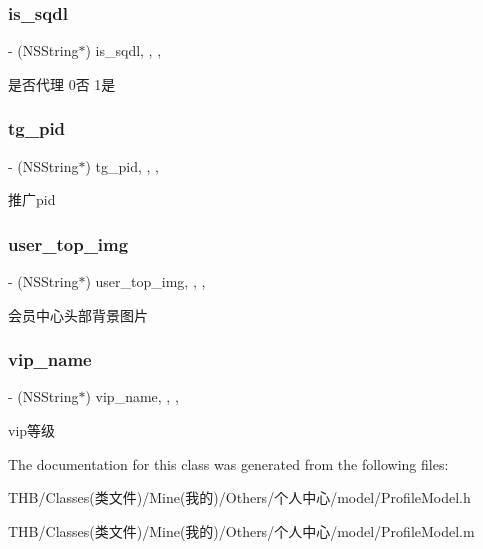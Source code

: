 \subsubsection{\texorpdfstring{is\+\_\+sqdl}{is\_sqdl}}
{\footnotesize\ttfamily -\/ (N\+S\+String$\ast$) is\+\_\+sqdl\hspace{0.3cm}{\ttfamily [read]}, {\ttfamily [write]}, {\ttfamily [nonatomic]}, {\ttfamily [copy]}}

是否代理 0否 1是 \mbox{\label{interface_profile_model_a1a01f027300ed47b07bd8d78e41c28c7}} 
\subsubsection{\texorpdfstring{tg\+\_\+pid}{tg\_pid}}
{\footnotesize\ttfamily -\/ (N\+S\+String$\ast$) tg\+\_\+pid\hspace{0.3cm}{\ttfamily [read]}, {\ttfamily [write]}, {\ttfamily [nonatomic]}, {\ttfamily [copy]}}

推广pid \mbox{\label{interface_profile_model_af7ab3b60129092798f302dd302d5bf6f}} 
\subsubsection{\texorpdfstring{user\+\_\+top\+\_\+img}{user\_top\_img}}
{\footnotesize\ttfamily -\/ (N\+S\+String$\ast$) user\+\_\+top\+\_\+img\hspace{0.3cm}{\ttfamily [read]}, {\ttfamily [write]}, {\ttfamily [nonatomic]}, {\ttfamily [copy]}}

会员中心头部背景图片 \mbox{\label{interface_profile_model_a2f9a51fafca570a20ceb90c590228982}} 
\subsubsection{\texorpdfstring{vip\+\_\+name}{vip\_name}}
{\footnotesize\ttfamily -\/ (N\+S\+String$\ast$) vip\+\_\+name\hspace{0.3cm}{\ttfamily [read]}, {\ttfamily [write]}, {\ttfamily [nonatomic]}, {\ttfamily [copy]}}

vip等级 

The documentation for this class was generated from the following files\+:\begin{DoxyCompactItemize}
\item 
T\+H\+B/\+Classes(类文件)/\+Mine(我的)/\+Others/个人中心/model/Profile\+Model.\+h\item 
T\+H\+B/\+Classes(类文件)/\+Mine(我的)/\+Others/个人中心/model/Profile\+Model.\+m\end{DoxyCompactItemize}
